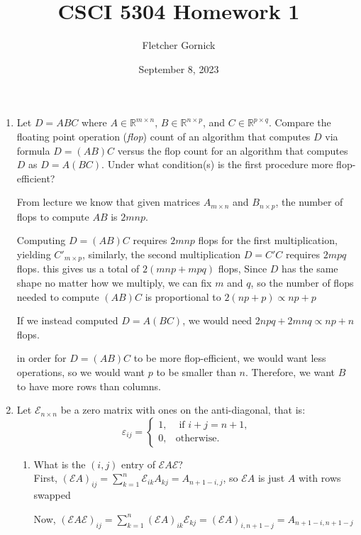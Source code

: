 \documentclass[11pt]{article}
\title{\vspace{-1.0cm}CSCI 5304 Homework 1}
\author{Fletcher Gornick}
\date{September 8, 2023}
\newcommand{\R}{\mathbb{R}}
\newcommand{\Eps}{\mathcal{E}}
\newcommand{\n}{\vspace{0.2cm}}
\begin{document}
\maketitle
\begin{enumerate}
	\item Let \(D = ABC\) where \(A \in \R^{m \times n}\), \(B \in \R^{n \times p}\), and \(C \in \R^{p \times q}\).  Compare the floating point operation (\textit{flop}) count of an algorithm that computes \(D\) via formula \(D = (AB)C\) versus the flop count for an algorithm that computes \(D\) as \(D = A(BC)\).  Under what condition(s) is the first procedure more flop-efficient?

	      From lecture we know that given matrices \(A_{m \times n}\) and \(B_{n \times p}\), the number of flops to compute \(AB\) is \(2mnp\).

	      Computing \(D = (AB)C\) requires \(2mnp\) flops for the first multiplication, yielding \(C'_{m \times p}\), similarly, the second multiplication \(D = C'C\) requires \(2mpq\) flops.  this gives us a total of \(2(mnp + mpq)\) flops, Since \(D\) has the same shape no matter how we multiply, we can fix \(m\) and \(q\), so the number of flops needed to compute \((AB)C\) is proportional to \(2(np + p) \propto np + p\)

	      If we instead computed \(D = A(BC)\), we would need \(2npq + 2mnq \propto np + n\) flops.

	      in order for \(D = (AB)C\) to be more flop-efficient, we would want less operations, so we would want \(p\) to be smaller than \(n\).  Therefore, we want \(B\) to have more rows than columns.


	\item Let \(\Eps_{n \times n}\) be a zero matrix with ones on the anti-diagonal, that is:
	      \[\varepsilon_{ij} = \begin{cases} 1, &\text{ if } i+j = n+1, \\ 0, &\text{otherwise.} \end{cases}\]
	      \begin{enumerate}[label=(\alph*)]
		      \item What is the \((i,j)\) entry of \(\Eps A \Eps\)? \n\\
		            First, \((\Eps A)_{ij} = \displaystyle\sum_{k=1}^n \Eps_{ik} A_{kj} = A_{n+1-i,j}\), so \(\Eps A\) is just \(A\) with rows swapped

		            Now, \((\Eps A \Eps)_{ij} = \displaystyle\sum_{k=1}^n (\Eps A)_{ik} \Eps_{kj} = (\Eps A)_{i, n+1-j} = A_{n+1-i, n+1-j}\)


\end{enumerate}
\end{enumerate}
\end{document}
